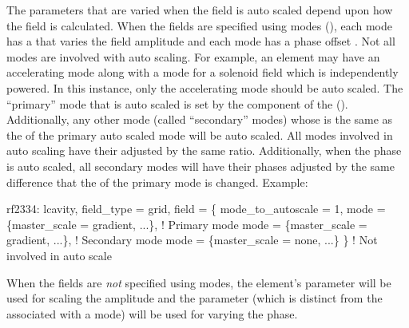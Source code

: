 The parameters that are varied when the field is auto scaled depend
upon how the field is calculated. When the fields are specified using
modes (), each mode has a  that
varies the field amplitude and each mode has a phase offset
. Not all modes are involved with auto scaling. For
example, an  element may have an accelerating mode along
with a mode for a solenoid field which is independently powered. In
this instance, only the accelerating mode should be auto scaled. The
``primary'' mode that is auto scaled is set by the
 component of the 
(). Additionally, any other mode (called ``secondary''
modes) whose  is the same as the  of
the primary auto scaled mode will be auto scaled. All modes involved in
auto scaling have their  adjusted by the same ratio.
Additionally, when the phase is auto scaled, all secondary modes will
have their  phases adjusted by the same difference that
the  of the primary mode is changed. Example:
\begin{example}
  rf2334: lcavity, field_type = grid, field = \{
    mode_to_autoscale = 1,
    mode = \{master_scale = gradient, ...\},   ! Primary mode
    mode = \{master_scale = gradient, ...\},   ! Secondary mode
    mode = \{master_scale = none, ...\} \}      ! Not involved in auto scale
\end{example}

When the fields are {\em not} specified using modes, the element's
 parameter will be used for scaling the amplitude and
the  parameter (which is distinct from the 
associated with a mode) will be used for varying the phase.









